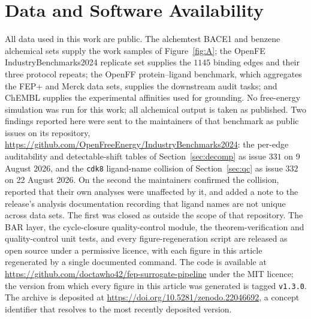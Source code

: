 \documentclass[journal=jctcce,manuscript=article]{achemso}
\theoremstyle{plain}
\theoremstyle{remark}
\begin{document}
\section*{Data and Software Availability}
All data used in this work are public. The alchemtest BACE1 and benzene alchemical sets supply the
work samples of Figure~\ref{fig:A}; the OpenFE IndustryBenchmarks2024 replicate set supplies the $1145$
binding edges and their three protocol repeats; the OpenFF protein--ligand benchmark, which
aggregates the FEP+ and Merck data sets, supplies the downstream audit tasks; and ChEMBL supplies
the experimental affinities used for grounding. No free-energy simulation was run for this work;
all alchemical output is taken as published.
Two findings reported here were sent to the maintainers of that benchmark as public issues on its
repository, \url{https://github.com/OpenFreeEnergy/IndustryBenchmarks2024}: the per-edge
auditability and detectable-shift tables of Section~\ref{sec:decomp} as issue $331$ on 9 August
2026, and the \texttt{cdk8} ligand-name collision of Section~\ref{sec:qc} as issue $332$ on
22 August 2026. On the second the maintainers confirmed the collision, reported that their own
analyses were unaffected by it, and added a note to the release's analysis documentation recording
that ligand names are not unique across data sets. The first was closed as outside the scope of
that repository.
The BAR layer, the cycle-closure quality-control module, the theorem-verification and
quality-control unit tests, and every figure-regeneration script are released as open source under
a permissive licence, with each figure in this article regenerated by a single documented command.
The code is available at \url{https://github.com/doctawho42/fep-surrogate-pipeline} under the
MIT licence; the version from which every figure in this article was generated is tagged
\texttt{v1.3.0}.
The archive is deposited at \url{https://doi.org/10.5281/zenodo.22046692}, a concept identifier
that resolves to the most recently deposited version.




\end{document}
